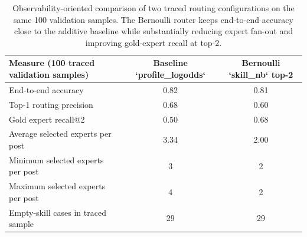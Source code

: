 \begin{table}[t]
\centering
\small
\begin{tabular}{lcc}
\hline
Measure (100 traced validation samples) & Baseline `profile\_logodds` & Bernoulli `skill\_nb` top-2 \\
\hline
End-to-end accuracy & 0.82 & 0.81 \\
Top-1 routing precision & 0.68 & 0.60 \\
Gold expert recall@2 & 0.50 & 0.68 \\
Average selected experts per post & 3.34 & 2.00 \\
Minimum selected experts per post & 3 & 2 \\
Maximum selected experts per post & 4 & 2 \\
Empty-skill cases in traced sample & 29 & 29 \\
\hline
\end{tabular}
\caption{Observability-oriented comparison of two traced routing configurations on the same 100 validation samples. The Bernoulli router keeps end-to-end accuracy close to the additive baseline while substantially reducing expert fan-out and improving gold-expert recall at top-2.}
\label{tab:langsmith_observability_comparison}
\end{table}
